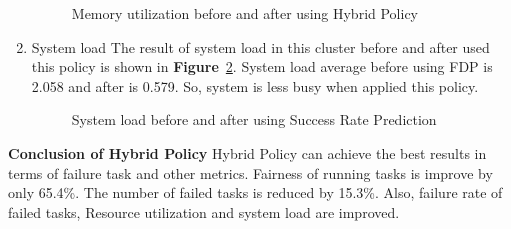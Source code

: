 \documentclass[12pt,oneside,openright,a4paper]{cpe-english-project}
\begin{document}
\begin{enumerate}
\begin{figure}[!h]
    \caption{Memory utilization before and after using Hybrid Policy}\label{fig:mem3}
\end{figure}

  \item System load
  \newline
  The result of system load in this cluster before and after used this policy is shown in \textbf{Figure}~\ref{fig:load3}. System load average before using FDP is 2.058 and after is 0.579. So, system is less busy when applied this policy.
\begin{figure}[!h]\centering
    \setlength{\fboxrule}{0mm} %
    \setlength{\fboxsep}{0cm}
    \caption{System load before and after using Success Rate Prediction}\label{fig:load3}
\end{figure}
\end{enumerate}
\textbf{Conclusion of Hybrid Policy}
\newline
\hspace{10mm}Hybrid Policy can achieve the best results in terms of failure task and other metrics. Fairness of running tasks is improve by only 65.4\%. The number of failed tasks is reduced by 15.3\%. Also, failure rate of failed tasks, Resource utilization and system load are improved.
\end{document}
